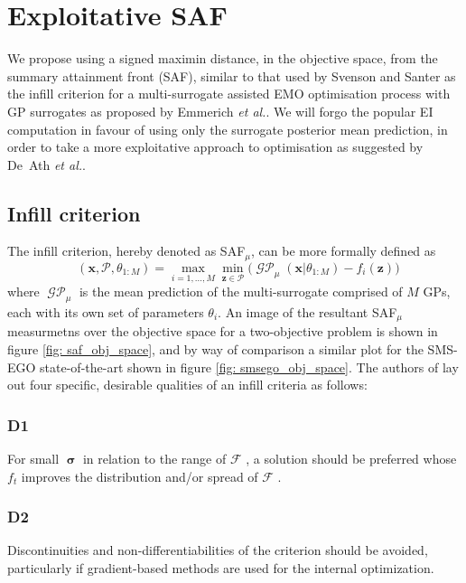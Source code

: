 \documentclass[conference]{IEEEtran}
\makeatletter
\newcommand{\paretofront}{\mathcal{F}}
\newcommand{\nobj}{M}
\DeclareMathOperator*{\msafmu}{SAF_\mu}
\DeclareMathOperator*{\mgp}{\mathcal{GP}}
\DeclareMathOperator{\posterioruncertainty}{\bm{\sigma}}
\newcommand\safmu{SAF$_{\mu}$\xspace}
\newcommand\ei{EI\xspace}
\newcommand\gp{GP\xspace}
\newcommand\gps{GPs\xspace}
\newcommand\maximin{maximin\xspace}
\newcommand\mP{\mathcal{P}}
\newcommand{\bx}{\mathbf{x}}
\newcommand{\bz}{\mathbf{z}}
\newcommand*{\etal}{\textit{et al.}\@\xspace}
\makeatother
\begin{document}
\section{Exploitative SAF}\label{section:our_method}
We propose using a signed \maximin distance, in the objective space, from the summary attainment front (SAF), similar to that used by Svenson and Santer \cite{svenson2016multiobjective} as the infill criterion for a multi-surrogate assisted EMO optimisation process with \gp surrogates as proposed by Emmerich \etal \cite{emmerich2006single}. We will forgo the popular \ei computation in favour of using only the surrogate posterior mean prediction, in order to take a more exploitative approach to optimisation as suggested by De~Ath \etal \cite{death2019greed}. 

\subsection{Infill criterion}\label{section: infill_criterion}
The infill criterion, hereby denoted as \safmu, can be more formally defined as
\begin{equation}\label{eqn: SAF}
  \msafmu(\mathbf{x}, \mathcal{P}, \theta_{1:\nobj}) = %
  \max_{i=1,\ldots, \nobj} \min_{\bz \in \mP} \big(\mgp_{\mu}(\bx|\theta_{1:\nobj}) - f_i(\bz)\big)
\end{equation}
where $\mgp_{\mu}$ is the mean prediction of the multi-surrogate comprised of $\nobj$ \gps, each with its own set of parameters $\theta_i$. An image of the resultant \safmu measurmetns over the objective space for a two-objective problem is shown in figure \ref{fig: saf_obj_space}, and by way of comparison a similar plot for the SMS-EGO state-of-the-art shown in figure \ref{fig: smsego_obj_space}. The authors of \cite{wagner2010expected} lay out four specific, desirable qualities of an infill criteria as follows:

\subsubsection{D1}
For small $\posterioruncertainty$ in relation to the range of $\paretofront$ , a solution should be preferred whose $f_t$ improves the distribution and/or spread of $\paretofront$ .

\subsubsection{D2}
Discontinuities and non-differentiabilities of the criterion should be avoided, particularly if gradient-based methods are used for the internal optimization.
\end{document}
